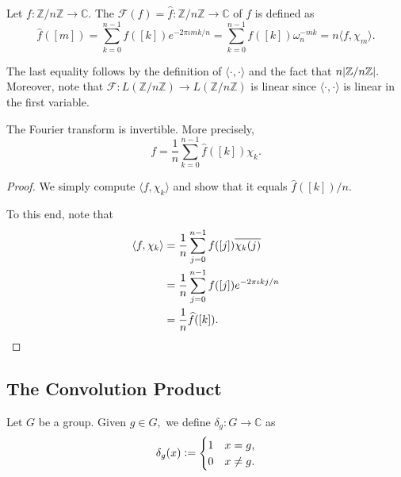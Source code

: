 \begin{defn} \label{defn:fourierZnZ}
    Let $f : \mathbb{Z}/n\mathbb{Z} \to \mathbb{C}.$ The  $\mathcal{F}(f) = \widehat{f} : \mathbb{Z}/n\mathbb{Z} \to \mathbb{C}$ of $f$ is defined as
    \begin{equation*}
        \widehat{f}([m]) = \sum_{k = 0}^{n - 1} f([k])e^{-2\pi\iota mk/n} = \sum_{k = 0}^{n - 1} f([k])\omega_n^{-mk} = n\langle f, \chi_m\rangle.
    \end{equation*}
\end{defn}

The last equality follows by the definition of $\langle \cdot , \cdot\rangle$ and the fact that $n {\left\lvert \mathbb{Z}/n\mathbb{Z} \right\lvert}.$ Moreover, note that $\mathcal{F} : L(\mathbb{Z}/n\mathbb{Z}) \to L(\mathbb{Z}/n\mathbb{Z})$ is linear since
$\langle \cdot , \cdot\rangle$ is linear in the first variable.

\begin{prop}
    The Fourier transform is invertible. More precisely, 
    \begin{equation*}
        f = \frac{1}{n}\sum_{k = 0}^{n - 1} \widehat{f}([k])\chi_k.
    \end{equation*}
\end{prop}
\begin{proof}
    We simply compute $\langle f, \chi_k\rangle$ and show that it equals $\widehat{f}([k])/n.$
    
    To this end, note that
    \begin{align*}
        \langle f, \chi_k\rangle &= \frac{1}{n} \sum_{j = 0}^{n - 1}f([j])\overline{\chi_k(j)} \\
        &= \frac{1}{n} \sum_{j = 0}^{n - 1}f([j])e^{-2\pi\iota kj/n} \\
        &= \frac{1}{n} \widehat{f}([k]). \qedhere
    \end{align*}
\end{proof}

\subsection{The Convolution Product}

\begin{defn}
    Let $G$ be a group.
    Given $g \in G,$ we define $\delta_g : G \to \mathbb{C}$ as
    \begin{equation*}
        \delta_g(x) \vcentcolon=
        \begin{cases}
            1 & x = g, \\
            0 & x \neq g.
        \end{cases}
    \end{equation*}
\end{defn}

